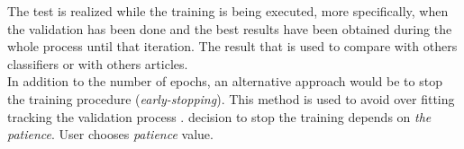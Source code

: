 The test is realized while the training is being executed, more specifically, when the validation has been done and the best results have been obtained during the whole process until that iteration. The result that is used to compare with others classifiers or with others articles.\\

In addition to the number of epochs, an alternative approach would be to stop the training procedure (\textit{early-stopping}). This method is used to avoid over fitting tracking the validation process \cite{Yoshua}. decision to stop the training depends on \textit{the patience}. User chooses \textit{patience} value.






